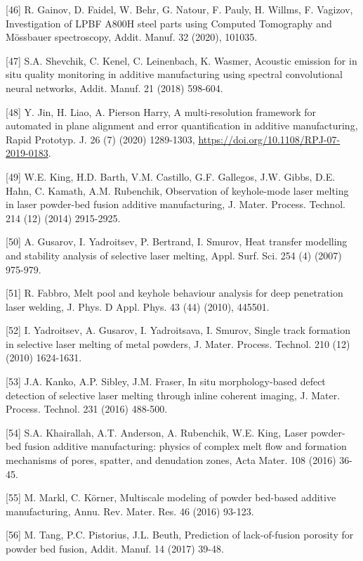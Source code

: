 \documentclass[10pt]{article}
\begin{document}
[46] R. Gainov, D. Faidel, W. Behr, G. Natour, F. Pauly, H. Willms, F. Vagizov, Investigation of LPBF A800H steel parts using Computed Tomography and Mössbauer spectroscopy, Addit. Manuf. 32 (2020), 101035.

[47] S.A. Shevchik, C. Kenel, C. Leinenbach, K. Wasmer, Acoustic emission for in situ quality monitoring in additive manufacturing using spectral convolutional neural networks, Addit. Manuf. 21 (2018) 598-604.

[48] Y. Jin, H. Liao, A. Pierson Harry, A multi-resolution framework for automated in plane alignment and error quantification in additive manufacturing, Rapid Prototyp. J. 26 (7) (2020) 1289-1303, \href{https://doi.org/10.1108/RPJ-07-2019-0183}{https://doi.org/10.1108/RPJ-07-2019-0183}.

[49] W.E. King, H.D. Barth, V.M. Castillo, G.F. Gallegos, J.W. Gibbs, D.E. Hahn, C. Kamath, A.M. Rubenchik, Observation of keyhole-mode laser melting in laser powder-bed fusion additive manufacturing, J. Mater. Process. Technol. 214 (12) (2014) 2915-2925.

[50] A. Gusarov, I. Yadroitsev, P. Bertrand, I. Smurov, Heat transfer modelling and stability analysis of selective laser melting, Appl. Surf. Sci. 254 (4) (2007) 975-979.

[51] R. Fabbro, Melt pool and keyhole behaviour analysis for deep penetration laser welding, J. Phys. D Appl. Phys. 43 (44) (2010), 445501.

[52] I. Yadroitsev, A. Gusarov, I. Yadroitsava, I. Smurov, Single track formation in selective laser melting of metal powders, J. Mater. Process. Technol. 210 (12) (2010) 1624-1631.

[53] J.A. Kanko, A.P. Sibley, J.M. Fraser, In situ morphology-based defect detection of selective laser melting through inline coherent imaging, J. Mater. Process. Technol. 231 (2016) 488-500.

[54] S.A. Khairallah, A.T. Anderson, A. Rubenchik, W.E. King, Laser powder-bed fusion additive manufacturing: physics of complex melt flow and formation mechanisms of pores, spatter, and denudation zones, Acta Mater. 108 (2016) 36-45.

[55] M. Markl, C. Körner, Multiscale modeling of powder bed-based additive manufacturing, Annu. Rev. Mater. Res. 46 (2016) 93-123.

[56] M. Tang, P.C. Pistorius, J.L. Beuth, Prediction of lack-of-fusion porosity for powder bed fusion, Addit. Manuf. 14 (2017) 39-48.
\end{document}
